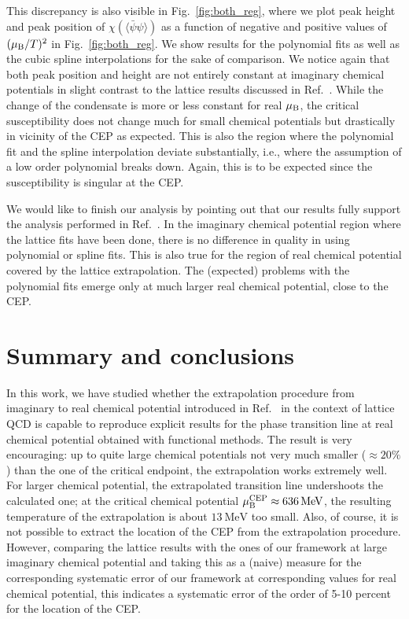 \documentclass[%
    aps,
    prd,
    reprint,
    superscriptaddress,
    floatfix,
    nofootinbib,
    noamsmath,
    noamssymb
]{revtex4-2}
\newcommand*{\+}{\hspace*{.08335em}}
\newcommand*{\?}{\hspace*{-.08335em}}
\newcommand*{\muB}{\mu_{\textup{B}}}
\newcommand*{\cond}{\langle \bar{\psi} \psi \rangle}
\begin{document}
This discrepancy is also visible in Fig.~\ref{fig:both_reg}, where we plot peak
height and peak position of $\chi(\cond)$ as a function of negative and positive
values of $(\muB / T)^{2}$ in Fig.~\ref{fig:both_reg}. We show results for the
polynomial fits as well as the cubic spline interpolations for the sake of
comparison. We notice again that both peak position and height are not entirely
constant at imaginary chemical potentials in slight contrast to the lattice
results discussed in Ref.~\cite{Borsanyi:2020fev}. While the change of the
condensate is more or less constant for real $\muB$, the critical susceptibility
does not change much for small chemical potentials but drastically in vicinity
of the CEP as expected. This is also the region where the polynomial fit and the
spline interpolation deviate substantially, i.e., where the assumption of a low
order polynomial breaks down. Again, this is to be expected since the
susceptibility is singular at the CEP.

We would like to finish our analysis by pointing out that our results fully support 
the analysis performed in Ref.~\cite{Borsanyi:2020fev}. In the imaginary chemical
potential region where the lattice fits have been done, there is no difference 
in quality 
in using polynomial or spline fits. This is also true for the region of real chemical 
potential covered by the lattice extrapolation. The (expected) problems with the 
polynomial fits emerge only at much larger real chemical potential, close to the CEP. 

\section{\label{summary}%
    Summary and conclusions
}

In this work, we have studied whether the extrapolation procedure from imaginary
to real chemical potential introduced in Ref.~\cite{Borsanyi:2020fev} in the
context of lattice QCD is capable to reproduce explicit results for the phase
transition line at real chemical potential obtained with functional methods. The
result is very encouraging: up to quite large chemical potentials not very much
smaller ($\approx 20 \%$) than the one of the critical endpoint, the
extrapolation works extremely well. For larger chemical potential, the
extrapolated transition line undershoots the calculated one; at the critical
chemical potential $\muB^{\textup{CEP}} \approx \SI{636}{\MeV}$, the resulting
temperature of the extrapolation is about $\SI{13}{\MeV}$ too small. Also, of
course, it is not possible to extract the location of the CEP from the
extrapolation procedure. However, comparing the lattice results with 
the ones of our framework at large imaginary chemical potential and taking this
as a (naive) measure for the corresponding systematic error of our framework at
corresponding values for real chemical potential, this indicates a systematic error 
of the order of 5-10 percent for the location of the CEP. 
\end{document}
